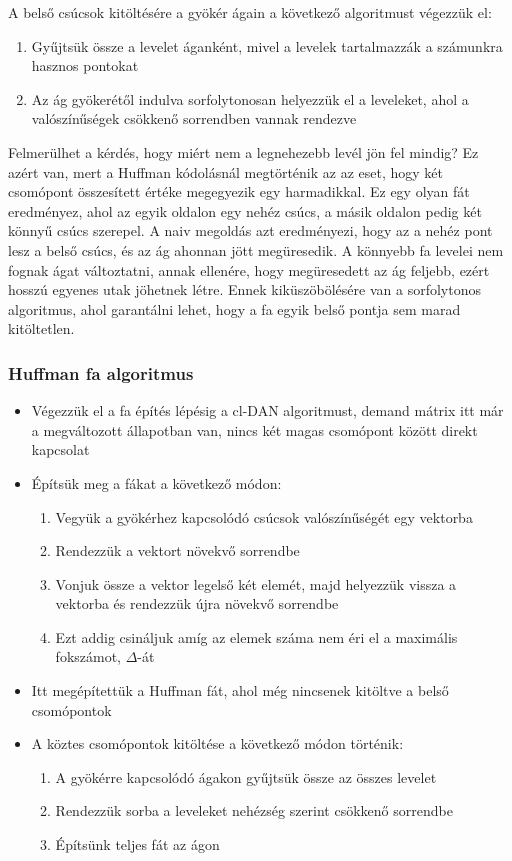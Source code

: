 \documentclass[12pt]{report}
\begin{document}
A belső csúcsok kitöltésére a gyökér ágain a következő algoritmust végezzük el:
\begin{enumerate}
	\item Gyűjtsük össze a levelet áganként, mivel a levelek tartalmazzák a számunkra hasznos pontokat 
	\item Az ág gyökerétől indulva sorfolytonosan helyezzük el a leveleket, ahol a valószínűségek csökkenő sorrendben vannak rendezve
\end{enumerate}

Felmerülhet a kérdés, hogy miért nem a legnehezebb levél jön fel mindig?
Ez azért van, mert a Huffman kódolásnál megtörténik az az eset, hogy két csomópont összesített értéke megegyezik egy harmadikkal.
Ez egy olyan fát eredményez, ahol az egyik oldalon egy nehéz csúcs, a másik oldalon pedig két könnyű csúcs szerepel.
A naiv megoldás azt eredményezi, hogy az a nehéz pont lesz a belső csúcs, és az ág ahonnan jött megüresedik.
A könnyebb fa levelei nem fognak ágat változtatni, annak ellenére, hogy megüresedett az ág feljebb, ezért hosszú egyenes utak jöhetnek létre.
Ennek kiküszöbölésére van a sorfolytonos algoritmus, ahol garantálni lehet, hogy a fa egyik belső pontja sem marad kitöltetlen.

\subsubsection{Huffman fa algoritmus}
\begin{itemize}
	\item Végezzük el a fa építés lépésig a cl-DAN algoritmust, demand mátrix itt már a megváltozott állapotban van, nincs két magas csomópont között direkt kapcsolat
	\item Építsük meg a fákat a következő módon:
	\begin{enumerate}
		\item Vegyük a gyökérhez kapcsolódó csúcsok valószínűségét egy vektorba
		\item Rendezzük a vektort növekvő sorrendbe
		\item Vonjuk össze a vektor legelső két elemét, majd helyezzük vissza a vektorba és rendezzük újra növekvő sorrendbe
		\item Ezt addig csináljuk amíg az elemek száma nem éri el a maximális fokszámot, $\Delta$-át
	\end{enumerate}
	\item Itt megépítettük a Huffman fát, ahol még nincsenek kitöltve a belső csomópontok
	\item A köztes csomópontok kitöltése a következő módon történik:
	\begin{enumerate}
		\item A gyökérre kapcsolódó ágakon gyűjtsük össze az összes levelet
		\item Rendezzük sorba a leveleket nehézség szerint csökkenő sorrendbe
		\item Építsünk teljes fát az ágon 
	\end{enumerate} 
\end{itemize}
\end{document}
